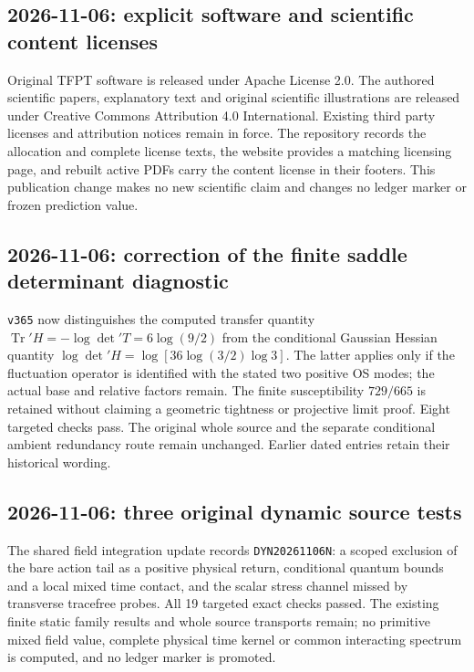 \subsection*{2026-11-06: explicit software and scientific content licenses}
Original TFPT software is released under Apache License 2.0. The authored
scientific papers, explanatory text and original scientific illustrations are
released under Creative Commons Attribution 4.0 International. Existing third
party licenses and attribution notices remain in force. The repository records
the allocation and complete license texts, the website provides a matching
licensing page, and rebuilt active PDFs carry the content license in their
footers. This publication change makes no new scientific claim and changes no
ledger marker or frozen prediction value.

\subsection*{2026-11-06: correction of the finite saddle determinant diagnostic}
\texttt{v365} now distinguishes the computed transfer quantity
$\operatorname{Tr}'H=-\log\det'T=6\log(9/2)$ from the conditional
Gaussian Hessian quantity $\log\det'H=\log[36\log(3/2)\log3]$.
The latter applies only if the fluctuation operator is identified with the
stated two positive OS modes; the actual base and relative factors remain.
The finite susceptibility $729/665$ is retained without claiming a geometric
tightness or projective limit proof. Eight targeted checks pass.
The original whole source and the separate conditional ambient redundancy
route remain unchanged. Earlier dated entries retain their historical wording.

\subsection*{2026-11-06: three original dynamic source tests}
The shared field integration update records \texttt{DYN20261106N}:
a scoped exclusion of the bare action tail as a positive physical return,
conditional quantum bounds and a local mixed time contact, and the scalar
stress channel missed by transverse tracefree probes. All 19 targeted exact
checks passed. The existing finite static family results and whole source transports
remain; no primitive mixed field value, complete physical time kernel or
common interacting spectrum is computed, and no ledger marker is promoted.

